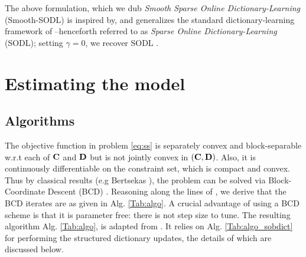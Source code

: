 The above formulation, which we dub \textit{Smooth Sparse Online Dictionary-Learning} (Smooth-SODL) is inspired by, and generalizes the standard
dictionary-learning framework of   \citep{mairal2010} --henceforth referred to as \textit{Sparse Online Dictionary-Learning} (SODL); setting $\gamma = 0$, we recover SODL   \citep{mairal2010}.


\section{Estimating the model}
\subsection{Algorithms}
The objective function in problem
\eqref{eq:ss} is separately convex and block-separable
w.r.t each of $\mathbf{C}$ and $\mathbf{D}$ but is not jointly convex in $(\mathbf{C},\mathbf{D})$. Also,
it is continuously differentiable on the constraint set, which is
compact and convex. Thus by classical results (e.g Bertsekas   \citep{bertsekas1999nonlinear}), the problem can be solved via
Block-Coordinate Descent
(BCD)   \citep{mairal2010}.
 Reasoning along the lines of   \citep{jenatton2010structured}, we derive
 that the BCD iterates are as given in Alg. \ref{Tab:algo}.
A crucial advantage of using a BCD scheme is that it is parameter
free: there is not step size to tune.
The resulting algorithm Alg. \ref{Tab:algo}, is adapted from   \citep{mairal2010}.
It relies on Alg. \ref{Tab:algo_sobdict} for performing the structured dictionary updates, the details of which are discussed below.

